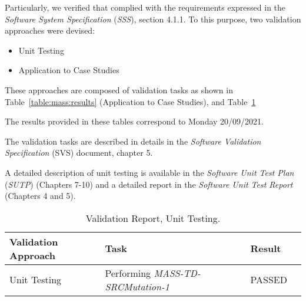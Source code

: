 
Particularly, we verified that \MASS complied with the requirements expressed in the \emph{Software System Specification} (\emph{SSS}), section 4.1.1.
To this purpose, two validation approaches were devised:

\begin{itemize}
  \item Unit Testing
  \item Application to Case Studies
\end{itemize}

These approaches are composed of validation tasks as shown in Table~\ref{table:mass:results} (Application to Case Studies), and Table~\ref{table:mass:unit_results}



The results provided in these tables correspond to Monday 20/09/2021.

The validation tasks are described in details in the \emph{Software Validation Specification} (SVS) document, chapter 5.

A detailed description of \MASS unit testing is available in the \emph{Software Unit Test Plan} (\emph{SUTP}) (Chapters 7-10) and a detailed report in the \emph{Software Unit Test Report} (Chapters 4 and 5).

\begin{table}[h]
\caption{\MASS Validation Report, Unit Testing.}
\label{table:mass:unit_results}
\scriptsize
\centering
\begin{tabular}{|l|l|l|l|}
\hline
\textbf{Validation Approach}&\textbf{Task}&\textbf{Result}\\
\hline
Unit Testing&Performing \emph{MASS-TD-SRCMutation-1}&PASSED\\
\hline
\end{tabular}

\end{table}


